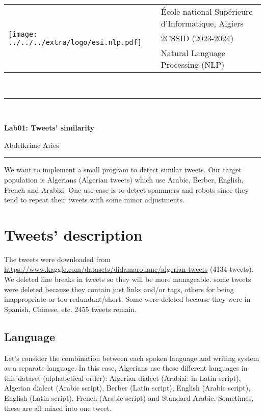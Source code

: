 \documentclass[11pt, a4paper]{article}
\begin{document}
	

\pagestyle{fancy}

\noindent
\begin{tabular}{ll}
	\multirow{3}{*}{\texttt{[image: ../../../extra/logo/esi.nlp.pdf]}} & \'Ecole national Supérieure d'Informatique, Algiers\\
	& 2CSSID (2023-2024)\\
	& Natural Language Processing (NLP)
\end{tabular}\\[.25cm]
\noindent\rule{\textwidth}{1pt}\\[-0.25cm]
\begin{center}
	{\LARGE \textbf{Lab01: Tweets' similarity}}
	\begin{flushright}
		Abdelkrime Aries
	\end{flushright}
\end{center}\vspace*{-0.25cm}
\noindent\rule{\textwidth}{1pt}


We want to implement a small program to detect similar tweets. 
Our target population is Algerians (Algerian tweets) which use Arabic, Berber, English, French and Arabizi.
One use case is to detect spammers and robots since they tend to repeat their tweets with some minor adjustments.  

\section{Tweets' description}

The tweets were downloaded from \url{https://www.kaggle.com/datasets/didamarouane/algerian-tweets} (4134 tweets).
We deleted line breaks in tweets so they will be more manageable.
some tweets were deleted because they contain just links and/or tags, others for being inappropriate or too redundant/short.
Some were deleted because they were in Spanish, Chinese, etc.
2455 tweets remain. 

\subsection{Language}

Let's consider the combination between each spoken language and writing system as a separate language.
In this case, Algerians use these different languages in this dataset (alphabetical order): Algerian dialect (Arabizi: in Latin script), Algerian dialect (Arabic script), Berber (Latin script), English (Arabic script), English (Latin script), French (Arabic script) and Standard Arabic.
Sometimes, these are all mixed into one tweet.
\end{document}
